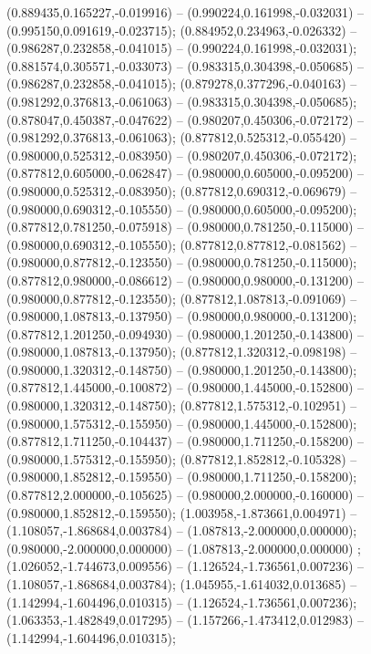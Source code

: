  (0.889435,0.165227,-0.019916) -- (0.990224,0.161998,-0.032031) -- (0.995150,0.091619,-0.023715);
 (0.884952,0.234963,-0.026332) -- (0.986287,0.232858,-0.041015) -- (0.990224,0.161998,-0.032031);
 (0.881574,0.305571,-0.033073) -- (0.983315,0.304398,-0.050685) -- (0.986287,0.232858,-0.041015);
 (0.879278,0.377296,-0.040163) -- (0.981292,0.376813,-0.061063) -- (0.983315,0.304398,-0.050685);
 (0.878047,0.450387,-0.047622) -- (0.980207,0.450306,-0.072172) -- (0.981292,0.376813,-0.061063);
 (0.877812,0.525312,-0.055420) -- (0.980000,0.525312,-0.083950) -- (0.980207,0.450306,-0.072172);
 (0.877812,0.605000,-0.062847) -- (0.980000,0.605000,-0.095200) -- (0.980000,0.525312,-0.083950);
 (0.877812,0.690312,-0.069679) -- (0.980000,0.690312,-0.105550) -- (0.980000,0.605000,-0.095200);
 (0.877812,0.781250,-0.075918) -- (0.980000,0.781250,-0.115000) -- (0.980000,0.690312,-0.105550);
 (0.877812,0.877812,-0.081562) -- (0.980000,0.877812,-0.123550) -- (0.980000,0.781250,-0.115000);
 (0.877812,0.980000,-0.086612) -- (0.980000,0.980000,-0.131200) -- (0.980000,0.877812,-0.123550);
 (0.877812,1.087813,-0.091069) -- (0.980000,1.087813,-0.137950) -- (0.980000,0.980000,-0.131200);
 (0.877812,1.201250,-0.094930) -- (0.980000,1.201250,-0.143800) -- (0.980000,1.087813,-0.137950);
 (0.877812,1.320312,-0.098198) -- (0.980000,1.320312,-0.148750) -- (0.980000,1.201250,-0.143800);
 (0.877812,1.445000,-0.100872) -- (0.980000,1.445000,-0.152800) -- (0.980000,1.320312,-0.148750);
 (0.877812,1.575312,-0.102951) -- (0.980000,1.575312,-0.155950) -- (0.980000,1.445000,-0.152800);
 (0.877812,1.711250,-0.104437) -- (0.980000,1.711250,-0.158200) -- (0.980000,1.575312,-0.155950);
 (0.877812,1.852812,-0.105328) -- (0.980000,1.852812,-0.159550) -- (0.980000,1.711250,-0.158200);
 (0.877812,2.000000,-0.105625) -- (0.980000,2.000000,-0.160000) -- (0.980000,1.852812,-0.159550);
 (1.003958,-1.873661,0.004971) -- (1.108057,-1.868684,0.003784) -- (1.087813,-2.000000,0.000000);
 (0.980000,-2.000000,0.000000) -- (1.087813,-2.000000,0.000000) ;
 (1.026052,-1.744673,0.009556) -- (1.126524,-1.736561,0.007236) -- (1.108057,-1.868684,0.003784);
 (1.045955,-1.614032,0.013685) -- (1.142994,-1.604496,0.010315) -- (1.126524,-1.736561,0.007236);
 (1.063353,-1.482849,0.017295) -- (1.157266,-1.473412,0.012983) -- (1.142994,-1.604496,0.010315);
